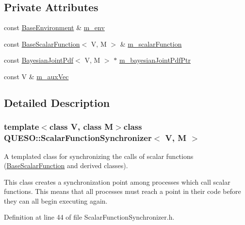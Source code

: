 \subsection*{Private Attributes}
\begin{DoxyCompactItemize}
\item 
const \hyperlink{class_q_u_e_s_o_1_1_base_environment}{Base\-Environment} \& \hyperlink{class_q_u_e_s_o_1_1_scalar_function_synchronizer_aa77a3d3b53267ef7c731836faaa082fb}{m\-\_\-env}
\item 
const \hyperlink{class_q_u_e_s_o_1_1_base_scalar_function}{Base\-Scalar\-Function}$<$ V, M $>$ \& \hyperlink{class_q_u_e_s_o_1_1_scalar_function_synchronizer_a6b24acdd3185e57cae74e6d5aedb90bf}{m\-\_\-scalar\-Function}
\item 
const \hyperlink{class_q_u_e_s_o_1_1_bayesian_joint_pdf}{Bayesian\-Joint\-Pdf}$<$ V, M $>$ $\ast$ \hyperlink{class_q_u_e_s_o_1_1_scalar_function_synchronizer_a0e17d294521cd22b297374ae2ff7f463}{m\-\_\-bayesian\-Joint\-Pdf\-Ptr}
\item 
const V \& \hyperlink{class_q_u_e_s_o_1_1_scalar_function_synchronizer_adbd43aee6de557012924f3e18660a4f3}{m\-\_\-aux\-Vec}
\end{DoxyCompactItemize}


\subsection{Detailed Description}
\subsubsection*{template$<$class V, class M$>$class Q\-U\-E\-S\-O\-::\-Scalar\-Function\-Synchronizer$<$ V, M $>$}

A templated class for synchronizing the calls of scalar functions (\hyperlink{class_q_u_e_s_o_1_1_base_scalar_function}{Base\-Scalar\-Function} and derived classes). 

This class creates a synchronization point among processes which call scalar functions. This means that all processes must reach a point in their code before they can all begin executing again. 

Definition at line 44 of file Scalar\-Function\-Synchronizer.\-h.



